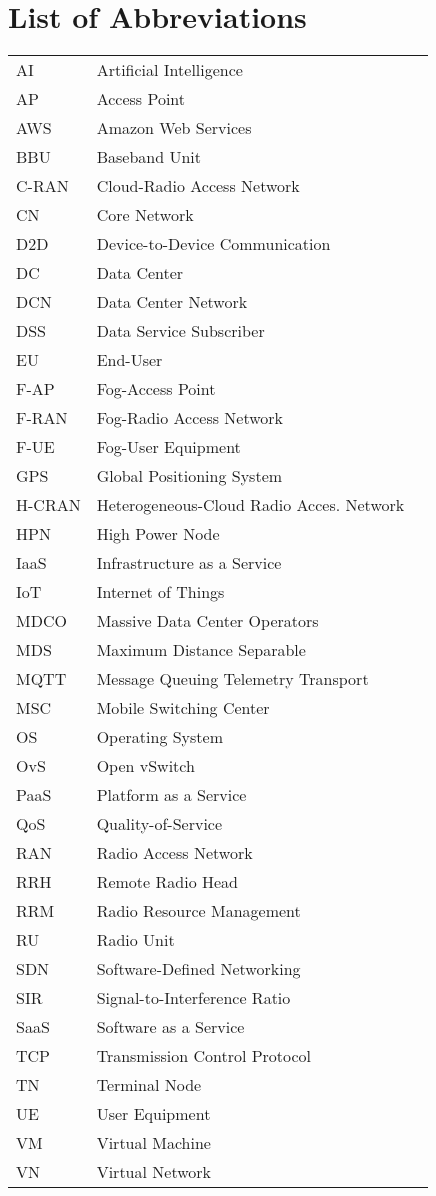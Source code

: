 \section*{List of Abbreviations}
\begin{table}[ht]
\begin{tabular}{lll}
AI & Artificial Intelligence \\
AP & Access Point \\
AWS & Amazon Web Services \\
BBU & Baseband Unit \\
C-RAN & Cloud-Radio Access Network \\
CN & Core Network \\
D2D & Device-to-Device Communication \\
DC & Data Center \\
DCN & Data Center Network \\
DSS & Data Service Subscriber \\
EU & End-User \\
F-AP & Fog-Access Point \\
F-RAN & Fog-Radio Access Network \\
F-UE & Fog-User Equipment \\
GPS & Global Positioning System \\
H-CRAN & Heterogeneous-Cloud Radio Acces. Network \\
HPN & High Power Node \\
IaaS & Infrastructure as a Service \\
IoT & Internet of Things \\
MDCO & Massive Data Center Operators \\
MDS & Maximum Distance Separable \\
MQTT & Message Queuing Telemetry Transport \\
MSC & Mobile Switching Center \\
OS & Operating System \\
OvS & Open vSwitch \\
PaaS & Platform as a Service \\
QoS & Quality-of-Service \\
RAN & Radio Access Network \\
RRH & Remote Radio Head \\
RRM & Radio Resource Management \\
RU & Radio Unit \\
SDN & Software-Defined Networking \\
SIR & Signal-to-Interference Ratio \\
SaaS & Software as a Service \\
TCP & Transmission Control Protocol \\
TN & Terminal Node \\
UE & User Equipment \\
VM & Virtual Machine \\
VN & Virtual Network \\
\end{tabular}
\end{table}
